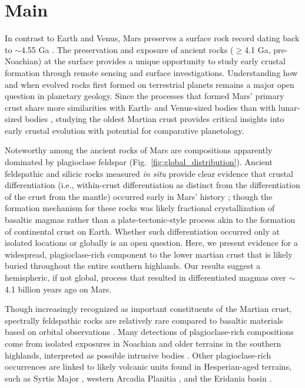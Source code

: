 \documentclass[12pt]{article}
\begin{document}
\section*{Main}
In contrast to Earth and Venus, Mars preserves a surface rock record dating back to $\sim$4.55 Ga \citep{Humayun2013, Kruijer2020}. The preservation and exposure of ancient rocks ($\geq$4.1 Ga, pre-Noachian) at the surface provides a unique opportunity to study early crustal formation through remote sensing and surface investigations. Understanding how and when evolved rocks first formed on terrestrial planets remains a major open question in planetary geology. Since the processes that formed Mars' primary crust share more similarities with Earth- and Venus-sized bodies than with lunar-sized bodies \citep{Elkins-Tanton2012}, studying the oldest Martian crust provides critical insights into early crustal evolution with potential for comparative planetology.

Noteworthy among the ancient rocks of Mars are compositions apparently dominated by plagioclase feldspar (Fig.~\ref{fig:global_distribution}). Ancient feldspathic and silicic rocks measured \textit{in situ} provide clear evidence that crustal differentiation (i.e., within-crust differentiation as distinct from the differentiation of the crust from the mantle) occurred early in Mars' history \citep[e.g.,][]{Stolper2013, Sautter2015}; though the formation mechanism for these rocks was likely fractional crystallization of basaltic magmas \citep{Udry2018,Ostwald2022} rather than a plate-tectonic-style process \citep{Sautter2015,Sautter2016} akin to the formation of continental crust on Earth. Whether such differentiation occurred only at isolated locations or globally is an open question. Here, we present evidence for a widespread, plagioclase-rich component to the lower martian crust that is likely buried throughout the entire southern highlands. Our results suggest a hemispheric, if not global, process that resulted in differentiated magmas over $\sim$4.1 billion years ago on Mars.

Though increasingly recognized as important constituents of the Martian crust, spectrally feldspathic rocks are relatively rare compared to basaltic materials based on orbital observations \citep{Ehlmann2014,McSween2015, McSween2009,McSween2023}. Many detections of plagioclase-rich compositions come from isolated exposures in Noachian and older terrains in the southern highlands, interpreted as possible intrusive bodies \citep{Quantin2012, Carter2013, Wray2013, Sautter2016, Viviano-Beck2017, Payre2022}. Other plagioclase-rich occurrences are linked to likely volcanic units found in Hesperian-aged terrains, such as Syrtis Major \citep{Wray2013, Eggers2021,Rogers2022}, western Arcadia Planitia \citep{Farrand2021}, and the Eridania basin \citep{Michalski2023}.
\end{document}
